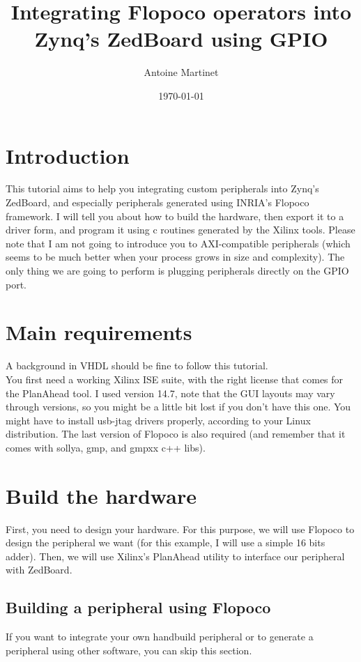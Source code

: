 \documentclass{article}
\title{Integrating Flopoco operators into Zynq's ZedBoard using GPIO}
\author{Antoine Martinet}
\date{\today}
\begin{document}
	\maketitle
	\tableofcontents
	\newpage
	\section*{Introduction}
		This tutorial aims to help you integrating custom peripherals into
		Zynq's ZedBoard, and especially peripherals generated using INRIA's
		Flopoco framework.
		I will tell you about how to build the hardware, then export it to a
		driver form, and program it using c routines generated by the Xilinx
		tools.
		Please note that I am not going to introduce you to AXI-compatible
		peripherals (which seems to be much better when your process grows in
				size and complexity). The only thing we are going to perform is
		plugging peripherals directly on the GPIO port.

	\section{Main requirements}
		A background in VHDL should be fine to follow this tutorial.\\
		You first need a working Xilinx ISE suite, with the right license that
		comes for the PlanAhead tool. I used version 14.7, note that the GUI
		layouts may vary through versions, so you might be a little bit lost if
		you don't have this one.
		You might have to install usb-jtag drivers properly, according to your
		Linux distribution.
		The last version of Flopoco is also required (and remember that it comes
				with sollya, gmp, and gmpxx c++ libs).

	\section{Build the hardware}
	First, you need to design your hardware. For this purpose, we will use
	Flopoco to design the peripheral we want (for this example, I will use a
			simple 16 bits adder). Then, we will use Xilinx's PlanAhead utility
	to interface our peripheral with ZedBoard.
	\subsection{Building a peripheral using Flopoco}
		If you want to integrate your own handbuild peripheral or to generate a
		peripheral using other software, you can skip this section.\\
\end{document}

